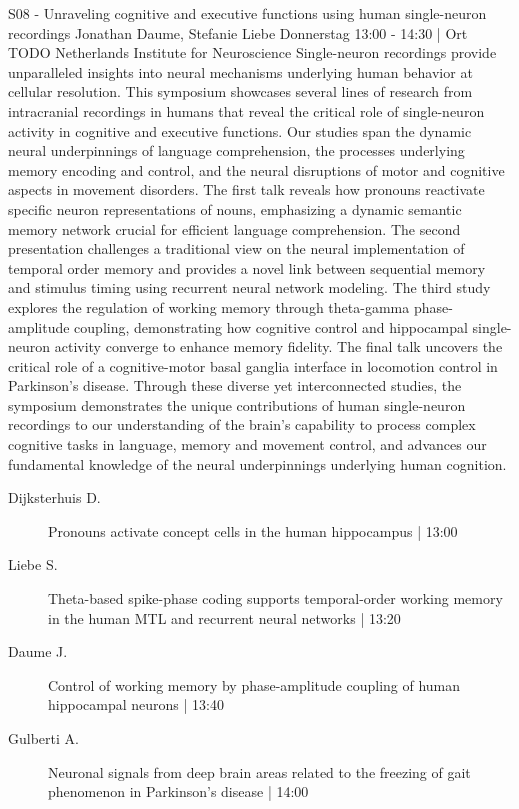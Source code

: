 
            \begin{symposium}
            {S08 - Unraveling cognitive and executive functions using human single-neuron recordings}
            {Jonathan Daume, Stefanie Liebe}
            {Donnerstag 13:00 - 14:30 | Ort TODO}
            {Netherlands Institute for Neuroscience}
            Single-neuron recordings provide unparalleled insights into neural mechanisms underlying human behavior at cellular resolution. This symposium showcases several lines of research from intracranial recordings in humans that reveal the critical role of single-neuron activity in cognitive and executive functions. Our studies span the dynamic neural underpinnings of language comprehension, the processes underlying memory encoding and control, and the neural disruptions of motor and cognitive aspects in movement disorders. The first talk reveals how pronouns reactivate specific neuron representations of nouns, emphasizing a dynamic semantic memory network crucial for efficient language comprehension. The second presentation challenges a traditional view on the neural implementation of temporal order memory and provides a novel link between sequential memory and stimulus timing using recurrent neural network modeling. The third study explores the regulation of working memory through theta-gamma phase-amplitude coupling, demonstrating how cognitive control and hippocampal single-neuron activity converge to enhance memory fidelity. The final talk uncovers the critical role of a cognitive-motor basal ganglia interface in locomotion control in Parkinson's disease. Through these diverse yet interconnected studies, the symposium demonstrates the unique contributions of human single-neuron recordings to our understanding of the brain's capability to process complex cognitive tasks in language, memory and movement control, and advances our fundamental knowledge of the neural underpinnings underlying human cognition.
            \begin{description}    
            
                \item [ Dijksterhuis D.] Pronouns activate concept cells in the human hippocampus \textcolor{mygray}{ | 13:00}    
                
                \item [ Liebe S.] Theta-based spike-phase coding supports temporal-order working memory in the human MTL and recurrent neural networks \textcolor{mygray}{ | 13:20}    
                
                \item [ Daume J.] Control of working memory by phase-amplitude coupling of human hippocampal neurons  \textcolor{mygray}{ | 13:40}    
                
                \item [ Gulberti A.] Neuronal signals from deep brain areas related to the freezing of gait phenomenon in Parkinson’s disease \textcolor{mygray}{ | 14:00}    
                
            \end{description} 
            \end{symposium}
            